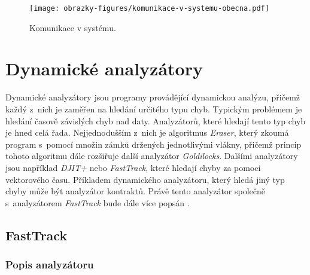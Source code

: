 \begin{figure}[!htb]
    \centering
    \texttt{[image: obrazky-figures/komunikace-v-systemu-obecna.pdf]}
    \caption{Komunikace v systému.}
    \label{komunikace-obecna}
\end{figure}



\chapter{Dynamické analyzátory}\label{dynamic-analysators}

Dynamické analyzátory jsou programy provádějící dynamickou analýzu, přičemž každý z~nich je zaměřen na hledání určitého typu chyb. Typickým problémem je hledání časově závislých chyb nad daty. Analyzátorů, které hledají tento typ chyb je hned celá řada. Nejjednodušším z~nich je algoritmus \textit{Eraser}, který zkoumá program s~pomocí množin zámků držených jednotlivými vlákny, přičemž princip tohoto algoritmu dále rozšiřuje další analyzátor \textit{Goldilocks}. Dalšími analyzátory jsou například \textit{DJIT+} nebo \textit{FastTrack}, které hledají chyby za pomoci vektorového času. Příkladem dynamického analyzátoru, který hledá jiný typ chyby může být analyzátor kontraktů. Právě tento analyzátor společně s~analyzátorem \textit{FastTrack} bude dále více popsán \cite{cite:ft,cite:eraser,cite:contract1}.

\section{FastTrack}\label{fasttrack}

\subsection{Popis analyzátoru}

